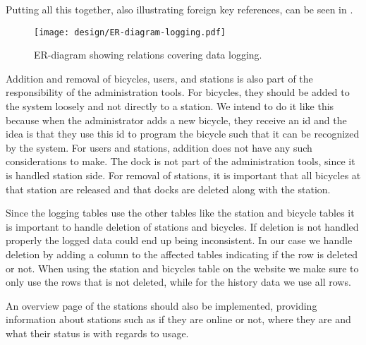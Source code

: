 Putting all this together, also illustrating foreign key references, can be seen in .

\begin{figure}
\texttt{[image: design/ER-diagram-logging.pdf]}
\vspace*{-2cm}
\caption{ER-diagram showing relations covering data logging.}\label{fig:er-dia-log}
\end{figure}

Addition and removal of bicycles, users, and stations is also part of the responsibility of the administration tools. 
For bicycles, they should be added to the system loosely and not directly to a station.
We intend to do it like this because when the administrator adds a new bicycle, they receive an id and the idea is that they use this id to program the bicycle such that it can be recognized by the system.
For users and stations, addition does not have any such considerations to make. 
The dock is not part of the administration tools, since it is handled station side.
For removal of stations, it is important that all bicycles at that station are released and that docks are deleted along with the station.

Since the logging tables use the other tables like the station and bicycle tables it is important to handle deletion of stations and bicycles. 
If deletion is not handled properly the logged data could end up being inconsistent. 
In our case we handle deletion by adding a column to the affected tables indicating if the row is deleted or not. 
When using the station and bicycles table on the website we make sure to only use the rows that is not deleted, while for the history data we use all rows.

An overview page of the stations should also be implemented, providing information about stations such as if they are online or not, where they are and what their status is with regards to usage.
